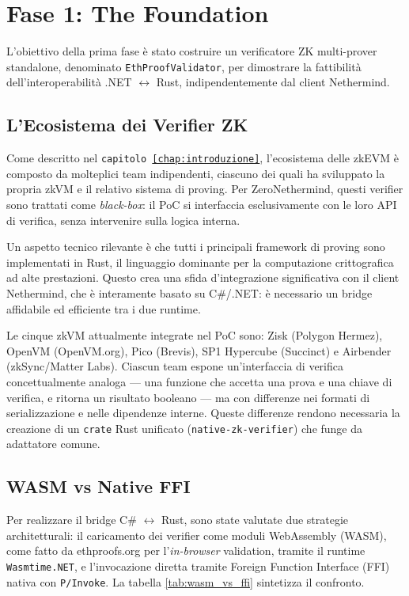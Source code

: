 \documentclass[12pt,a4paper,openright,twoside]{report}
\begin{document}
\section{Fase 1: The Foundation}\label{sec:foundation}

L'obiettivo della prima fase è stato costruire un verificatore ZK multi-prover standalone, denominato \texttt{EthProofValidator}, per dimostrare la fattibilità dell'interoperabilità .NET $\leftrightarrow$ Rust, indipendentemente dal client Nethermind.

\subsection{L'Ecosistema dei Verifier ZK}

Come descritto nel \texttt{capitolo \ref{chap:introduzione}}, l'ecosistema delle zkEVM è composto da molteplici team indipendenti, ciascuno dei quali ha sviluppato la propria zkVM e il relativo sistema di proving. Per ZeroNethermind, questi verifier sono trattati come \textit{black-box}: il PoC si interfaccia esclusivamente con le loro API di verifica, senza intervenire sulla logica interna.

Un aspetto tecnico rilevante è che tutti i principali framework di proving sono implementati in Rust, il linguaggio dominante per la computazione crittografica ad alte prestazioni. Questo crea una sfida d'integrazione significativa con il client Nethermind, che è interamente basato su C\#/.NET: è necessario un bridge affidabile ed efficiente tra i due runtime.

Le cinque zkVM attualmente integrate nel PoC sono: Zisk (Polygon Hermez), OpenVM (OpenVM.org), Pico (Brevis), SP1 Hypercube (Succinct) e Airbender (zkSync/Matter Labs). Ciascun team espone un'interfaccia di verifica concettualmente analoga — una funzione che accetta una prova e una chiave di verifica, e ritorna un risultato booleano — ma con differenze nei formati di serializzazione e nelle dipendenze interne. Queste differenze rendono necessaria la creazione di un \texttt{crate} Rust unificato (\texttt{native-zk-verifier}) che funge da adattatore comune.

\subsection{WASM vs Native FFI}\label{sec:wasm_vs_ffi}

Per realizzare il bridge C\# $\leftrightarrow$ Rust, sono state valutate due strategie architetturali: il caricamento dei verifier come moduli WebAssembly (WASM), come fatto da ethproofs.org per l'\textit{in-browser} validation, tramite il runtime \texttt{Wasmtime.NET}, e l'invocazione diretta tramite Foreign Function Interface (FFI) nativa con \texttt{P/Invoke}. La tabella \ref{tab:wasm_vs_ffi} sintetizza il confronto.
\end{document}
